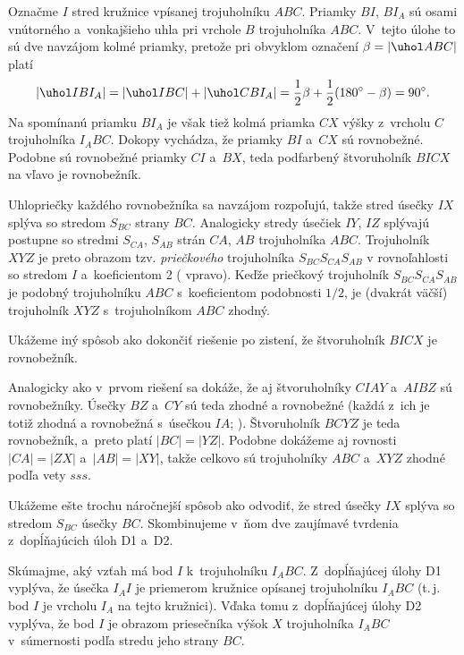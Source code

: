 {%
Označme $I$ stred kružnice vpísanej trojuholníku $ABC$. Priamky $BI$, $BI_A$ sú osami vnútorného a~vonkajšieho uhla pri vrchole $B$ trojuholníka $ABC$. V~tejto úlohe
to sú dve navzájom kolmé priamky, pretože pri obvyklom označení $\beta=|\uhol ABC|$ platí
$$|\uhol IBI_A|=|\uhol IBC|+|\uhol CBI_A| = \frac12\beta + \frac12(180^\circ-\beta)=90^\circ.
$$
Na spomínanú priamku $BI_A$ je však tiež kolmá priamka $CX$ výšky z~vrcholu $C$
 trojuholníka $I_ABC$. Dokopy vychádza, že priamky $BI$ a~$CX$ sú rovnobežné. Podobne sú rovnobežné priamky $CI$ a~$BX$, teda podfarbený štvoruholník $BICX$ na \obr{} vľavo je rovnobežník.
%

Uhlopriečky každého rovnobežníka sa navzájom rozpoľujú, takže stred úsečky $IX$ splýva so stredom $S_{BC}$ strany $BC$. Analogicky stredy úsečiek $IY$, $IZ$ splývajú postupne so stredmi $S_{CA}$, $S_{AB}$ strán $CA$, $AB$ trojuholníka $ABC$. Trojuholník $XYZ$ je preto obrazom tzv. {\it priečkového} trojuholníka $S_{BC}S_{CA}S_{AB}$ v rovnoľahlosti so stredom $I$ a~koeficientom 2 ( vpravo). Keďže priečkový trojuholník $S_{BC}S_{CA}S_{AB}$ je podobný trojuholníku $ABC$ s~koeficientom podobnosti $1/2$, je (dvakrát väčší) trojuholník $XYZ$ s~trojuholníkom $ABC$ zhodný.

\ineriesenie
Ukážeme iný spôsob ako dokončiť riešenie po zistení, že štvoruholník $BICX$ je rovnobežník.

Analogicky ako v~prvom riešení sa dokáže, že aj štvoruholníky $CIAY$ a~$AIBZ$ sú rovnobežníky.
Úsečky $BZ$ a~$CY$ sú teda zhodné a rovnobežné (každá z~ich je totiž zhodná a
rovnobežná s~úsečkou $IA$; \obr). Štvoruholník $BCYZ$ je teda rovnobežník, a~preto platí $|BC|=|YZ|$.
Podobne dokážeme aj rovnosti $|CA|=|ZX|$ a~$|AB|=|XY|$, takže celkovo sú trojuholníky $ABC$ a~$XYZ$ zhodné podľa vety $sss$.
%

\ineriesenie
Ukážeme ešte trochu náročnejší spôsob ako odvodiť, že stred úsečky $IX$ splýva so stredom $S_{BC}$ úsečky $BC$. Skombinujeme v~ňom dve zaujímavé tvrdenia z~dopĺňajúcich úloh D1 a~D2.

Skúmajme, aký vzťah má bod $I$ k~trojuholníku $I_ABC$.
Z~dopĺňajúcej úlohy D1 vyplýva, že úsečka $I_AI$ je priemerom kružnice opísanej trojuholníku $I_ABC$ (t.\,j. bod $I$ je  vrcholu $I_A$ na tejto kružnici).
Vďaka tomu z~dopĺňajúcej úlohy D2 vyplýva, že bod $I$ je obrazom priesečníka výšok $X$ trojuholníka $I_ABC$ v~súmernosti podľa stredu jeho strany $BC$.



}
